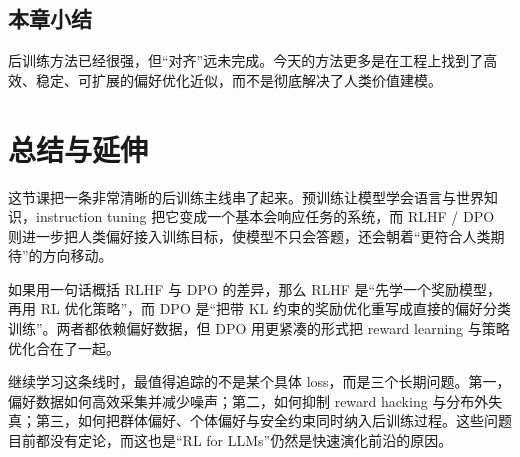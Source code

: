 \documentclass[a4paper]{article}
\begin{document}
\subsection{本章小结}
后训练方法已经很强，但“对齐”远未完成。今天的方法更多是在工程上找到了高效、稳定、可扩展的偏好优化近似，而不是彻底解决了人类价值建模。

\section{总结与延伸}
这节课把一条非常清晰的后训练主线串了起来。预训练让模型学会语言与世界知识，instruction tuning 把它变成一个基本会响应任务的系统，而 RLHF / DPO 则进一步把人类偏好接入训练目标，使模型不只会答题，还会朝着“更符合人类期待”的方向移动。

如果用一句话概括 RLHF 与 DPO 的差异，那么 RLHF 是“先学一个奖励模型，再用 RL 优化策略”，而 DPO 是“把带 KL 约束的奖励优化重写成直接的偏好分类训练”。两者都依赖偏好数据，但 DPO 用更紧凑的形式把 reward learning 与策略优化合在了一起。

继续学习这条线时，最值得追踪的不是某个具体 loss，而是三个长期问题。第一，偏好数据如何高效采集并减少噪声；第二，如何抑制 reward hacking 与分布外失真；第三，如何把群体偏好、个体偏好与安全约束同时纳入后训练过程。这些问题目前都没有定论，而这也是“RL for LLMs”仍然是快速演化前沿的原因。
\end{document}
